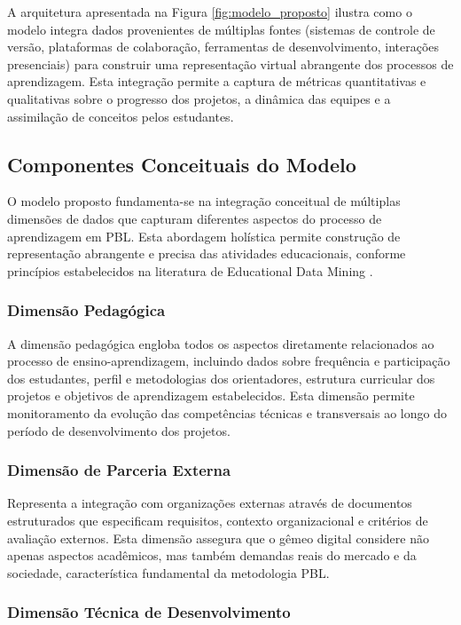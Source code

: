 \documentclass[12pt,a4paper]{article}
\renewcommand{\cite}[1]{}
\begin{document}
A arquitetura apresentada na Figura \ref{fig:modelo_proposto} ilustra como o
modelo integra dados provenientes de múltiplas fontes (sistemas de controle de
versão, plataformas de colaboração, ferramentas de desenvolvimento, interações
presenciais) para construir uma representação virtual abrangente dos processos
de aprendizagem. Esta integração permite a captura de métricas quantitativas e
qualitativas sobre o progresso dos projetos, a dinâmica das equipes e a
assimilação de conceitos pelos estudantes.

\subsection{Componentes Conceituais do Modelo}

O modelo proposto fundamenta-se na integração conceitual de múltiplas dimensões
de dados que capturam diferentes aspectos do processo de aprendizagem em PBL.
Esta abordagem holística permite construção de representação abrangente e
precisa das atividades educacionais, conforme princípios estabelecidos na
literatura de Educational Data Mining \cite{romero2010, romero2020}.

\subsubsection{Dimensão Pedagógica}

A dimensão pedagógica engloba todos os aspectos diretamente relacionados ao
processo de ensino-aprendizagem, incluindo dados sobre frequência e
participação dos estudantes, perfil e metodologias dos orientadores, estrutura
curricular dos projetos e objetivos de aprendizagem estabelecidos. Esta
dimensão permite monitoramento da evolução das competências técnicas e
transversais ao longo do período de desenvolvimento dos projetos.

\subsubsection{Dimensão de Parceria Externa}

Representa a integração com organizações externas através de documentos
estruturados que especificam requisitos, contexto organizacional e critérios de
avaliação externos. Esta dimensão assegura que o gêmeo digital considere não
apenas aspectos acadêmicos, mas também demandas reais do mercado e da
sociedade, característica fundamental da metodologia PBL.

\subsubsection{Dimensão Técnica de Desenvolvimento}
\end{document}
